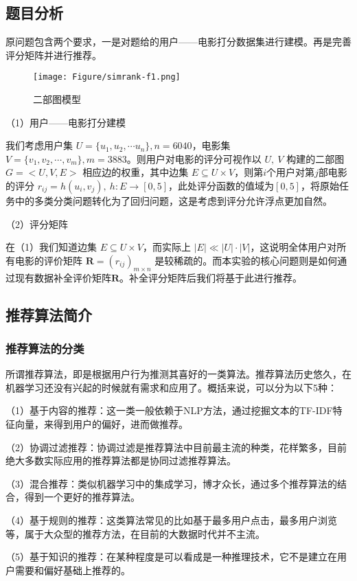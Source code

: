 \subsection{题目分析}
\xiaosi\begin{spacing}{1.5}
原问题包含两个要求，一是对题给的用户——电影打分数据集进行建模。再是完善评分矩阵并进行推荐。\par
\begin{wrapfigure}{r}{5cm}%
\centering
\texttt{[image: Figure/simrank-f1.png]}
\caption{二部图模型}
\end{wrapfigure}
（1）用户——电影打分建模\par
我们考虑用户集 $U=\{u_1,u_2,\cdots u_n\},n=6040$，电影集 $V=\{v_1,v_2,\cdots,v_m\},m=3883$。则用户对电影的评分可视作以 $U,\ V$ 构建的二部图 $G=<U,V,E>$ 相应边的权重，其中边集 $E \subseteq U \times V$，则第$i$个用户对第$j$部电影的评分 $r_{ij}=h(u_i,v_j),\ h:E\rightarrow [0,5]$，此处评分函数的值域为$[0,5]$，将原始任务中的多类分类问题转化为了回归问题，这是考虑到评分允许浮点更加自然。\par
（2）评分矩阵\par
在（1）我们知道边集 $E \subseteq U \times V$，而实际上 $|E|\ll |U|\cdot|V|$，这说明全体用户对所有电影的评价矩阵 $\mathbf{R}=(r_{ij})_{m\times n}$ 是较稀疏的。而本实验的核心问题则是如何通过现有数据补全评价矩阵$\mathbf{R}$。补全评分矩阵后我们将基于此进行推荐。
\end{spacing}

\subsection{推荐算法简介}
\subsubsection{推荐算法的分类}
\xiaosi\begin{spacing}{1.5}
所谓推荐算法，即是根据用户行为推测其喜好的一类算法。推荐算法历史悠久，在机器学习还没有兴起的时候就有需求和应用了。概括来说，可以分为以下5种\cite{1}：\par
（1）基于内容的推荐：这一类一般依赖于NLP方法，通过挖掘文本的TF-IDF特征向量，来得到用户的偏好，进而做推荐。\par
（2）协调过滤推荐：协调过滤是推荐算法中目前最主流的种类，花样繁多，目前绝大多数实际应用的推荐算法都是协同过滤推荐算法。\par
（3）混合推荐：类似机器学习中的集成学习，博才众长，通过多个推荐算法的结合，得到一个更好的推荐算法。\par
（4）基于规则的推荐：这类算法常见的比如基于最多用户点击，最多用户浏览等，属于大众型的推荐方法，在目前的大数据时代并不主流。\par
（5）基于知识的推荐：在某种程度是可以看成是一种推理技术，它不是建立在用户需要和偏好基础上推荐的。\par
\end{spacing}
